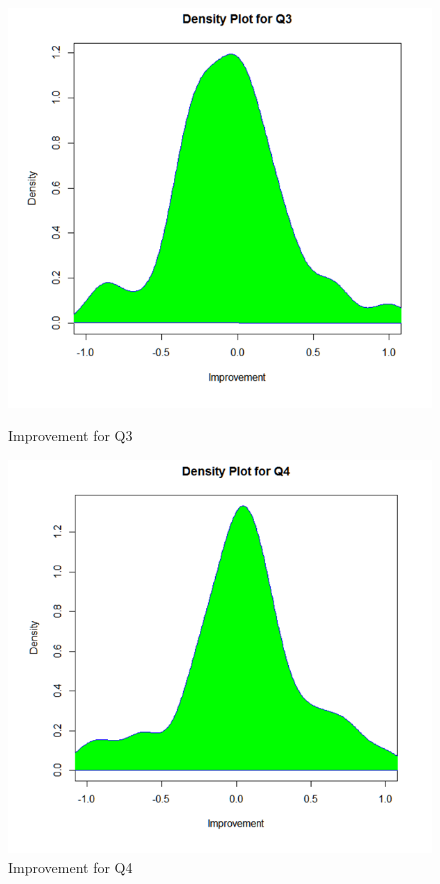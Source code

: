 \begin{figure}
	\centering
	\begin{minipage}{.5\textwidth}
		\centering
		\includegraphics[width=1\linewidth]{figures/Prepost_q3}
		\caption{Improvement for Q3}
		\label{fig:Prepost_q3}
	\end{minipage}%
	\begin{minipage}{.5\textwidth}
		\centering
		\includegraphics[width=1\linewidth]{figures/Prepost_q4}
		\caption{Improvement for Q4}
		\label{fig:Prepost_q4}
	\end{minipage}
\end{figure}

